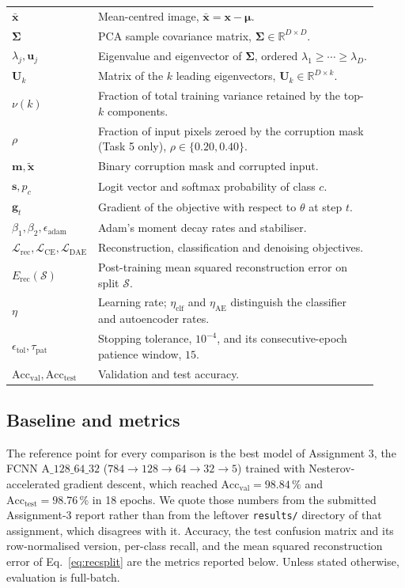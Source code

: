 \documentclass[11pt,a4paper]{article}
\newcommand{\R}{\mathbb{R}}\newcommand{\given}{\mid}\newcommand{\Acc}{\mathrm{Acc}}
\newcommand{\code}[1]{\texttt{#1}}
\begin{document}
\begin{table}[htbp]
\begin{tabular}{@{}p{0.10\linewidth}p{0.82\linewidth}@{}}
$\bar{\mathbf{x}}$ & Mean-centred image, $\bar{\mathbf{x}}=\mathbf{x}-\boldsymbol{\mu}$. \\
$\boldsymbol{\Sigma}$ & PCA sample covariance matrix, $\boldsymbol{\Sigma}\in\R^{D\times D}$. \\
$\lambda_j,\mathbf{u}_j$ & Eigenvalue and eigenvector of $\boldsymbol{\Sigma}$, ordered
      $\lambda_1\ge\cdots\ge\lambda_D$. \\
$\mathbf{U}_k$ & Matrix of the $k$ leading eigenvectors, $\mathbf{U}_k\in\R^{D\times k}$. \\
$\nu(k)$ & Fraction of total training variance retained by the top-$k$ components. \\
$\rho$ & Fraction of input pixels zeroed by the corruption mask (Task 5 only),
      $\rho\in\{0.20,0.40\}$. \\
$\mathbf{m},\tilde{\mathbf{x}}$ & Binary corruption mask and corrupted input. \\
$\mathbf{s},p_c$ & Logit vector and softmax probability of class $c$. \\
$\mathbf{g}_t$ & Gradient of the objective with respect to $\theta$ at step $t$. \\
$\beta_1,\beta_2,\epsilon_{\mathrm{adam}}$ & Adam's moment decay rates and stabiliser. \\
$\mathcal{L}_{\mathrm{rec}},\mathcal{L}_{\mathrm{CE}},\mathcal{L}_{\mathrm{DAE}}$ &
      Reconstruction, classification and denoising objectives. \\
$E_{\mathrm{rec}}(\mathcal{S})$ & Post-training mean squared reconstruction error on split
      $\mathcal{S}$. \\
$\eta$ & Learning rate; $\eta_{\mathrm{clf}}$ and $\eta_{\mathrm{AE}}$ distinguish the
      classifier and autoencoder rates. \\
$\epsilon_{\mathrm{tol}},\tau_{\mathrm{pat}}$ & Stopping tolerance, $10^{-4}$, and its
      consecutive-epoch patience window, $15$. \\
$\Acc_{\mathrm{val}},\Acc_{\mathrm{test}}$ & Validation and test accuracy. \\
\bottomrule
\end{tabular}
\end{table}

\subsection{Baseline and metrics}\label{sec:dataset:baseline}
The reference point for every comparison is the best model of Assignment 3, the FCNN
$\mathrm{A\_128\_64\_32}$ ($784\rightarrow128\rightarrow64\rightarrow32\rightarrow5$) trained
with Nesterov-accelerated gradient descent, which reached $\Acc_{\mathrm{val}}=98.84\,\%$ and
$\Acc_{\mathrm{test}}=98.76\,\%$ in 18 epochs.  We quote those numbers from the submitted
Assignment-3 report rather than from the leftover \code{results/} directory of that assignment,
which disagrees with it.  Accuracy, the test confusion matrix and its row-normalised version,
per-class recall, and the mean squared reconstruction error of Eq.~\eqref{eq:recsplit} are the
metrics reported below.  Unless stated otherwise, evaluation is full-batch.
\end{document}
